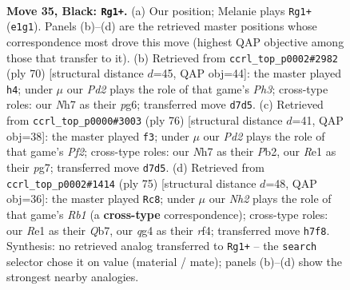 \documentclass[11pt]{article}
\begin{document}
\clearpage

\begin{figure}[p]\centering
\begin{subfigure}{0.46\textwidth}\centering
\resizebox{\linewidth}{!}{%
\newchessgame
\chessboard[
  setfen={7k/p2p3n/2p2p2/8/1P1P2Q1/6R1/5PKP/2q1r3 b - - 3 35},
  showmover=false,
  pgfstyle=straightmove, color=movearrow, markmove={e1-g1}
]}
\caption{}
\end{subfigure}\hfill
\begin{subfigure}{0.46\textwidth}\centering
\resizebox{\linewidth}{!}{%
\newchessgame
\chessboard[
  setfen={8/3q1rk1/p5p1/1p5p/8/6PP/P3QP2/2R3K1 w - - 2 36},
  showmover=false,
  pgfstyle=straightmove, color=movearrow, markmove={h3-h4}
]}
\caption{}
\end{subfigure}
\\[4pt]
\begin{subfigure}{0.46\textwidth}\centering
\resizebox{\linewidth}{!}{%
\newchessgame
\chessboard[
  setfen={5rk1/6p1/7p/p1q1p3/7P/6P1/1P1RQP1K/8 w - - 2 39},
  showmover=false,
  pgfstyle=straightmove, color=movearrow, markmove={f2-f3}
]}
\caption{}
\end{subfigure}\hfill
\begin{subfigure}{0.46\textwidth}\centering
\resizebox{\linewidth}{!}{%
\newchessgame
\chessboard[
  setfen={1r6/1q3pk1/6pp/8/2Q2R2/4P1PP/5P1K/8 b - - 11 38},
  showmover=false,
  pgfstyle=straightmove, color=movearrow, markmove={b8-c8}
]}
\caption{}
\end{subfigure}
\caption{\textbf{Move 35, Black: \texttt{Rg1+}.} (a) Our position; Melanie plays \texttt{Rg1+} (\texttt{e1g1}). Panels (b)--(d) are the retrieved master positions whose correspondence most drove this move (highest QAP objective among those that transfer to it). (b) Retrieved from \texttt{ccrl\_top\_p0002\#2982} (ply 70) [structural distance $d$=45, QAP obj=44]: the master played \texttt{h4}; under $\mu$ our \emph{Pd2} plays the role of that game's \emph{Ph3}; cross-type roles: our \emph{N}h7 as their \emph{p}g6; transferred move \texttt{d7d5}. (c) Retrieved from \texttt{ccrl\_top\_p0000\#3003} (ply 76) [structural distance $d$=41, QAP obj=38]: the master played \texttt{f3}; under $\mu$ our \emph{Pd2} plays the role of that game's \emph{Pf2}; cross-type roles: our \emph{N}h7 as their \emph{P}b2, our \emph{R}e1 as their \emph{p}g7; transferred move \texttt{d7d5}. (d) Retrieved from \texttt{ccrl\_top\_p0002\#1414} (ply 75) [structural distance $d$=48, QAP obj=36]: the master played \texttt{Rc8}; under $\mu$ our \emph{Nh2} plays the role of that game's \emph{Rb1} (a \textbf{cross-type} correspondence); cross-type roles: our \emph{R}e1 as their \emph{Q}b7, our \emph{q}g4 as their \emph{r}f4; transferred move \texttt{h7f8}. Synthesis: no retrieved analog transferred to \texttt{Rg1+} -- the \texttt{search} selector chose it on value (material / mate); panels (b)--(d) show the strongest nearby analogies.}
\label{fig:thought-m69}
\end{figure}
\end{document}
